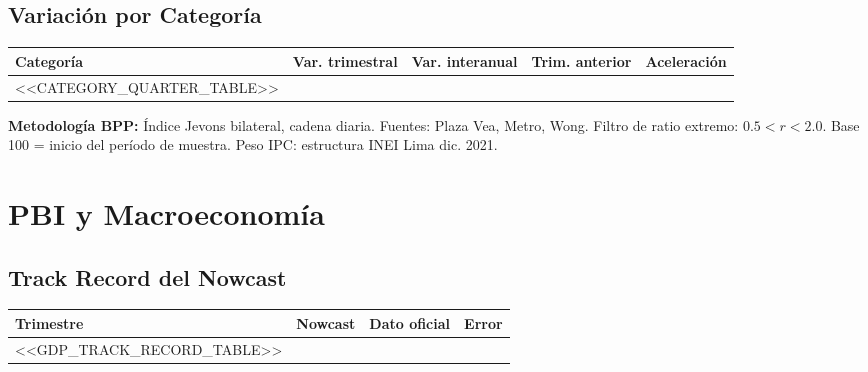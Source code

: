 \documentclass[10pt,a4paper]{article}
\begin{document}
\vspace{0.6em}

\subsection{Variación por Categoría}

\begin{center}
\begin{tabular}{lrrll}
  \toprule
  \textbf{Categoría} & \textbf{Var. trimestral} & \textbf{Var. interanual} & \textbf{Trim. anterior} & \textbf{Aceleración} \\
  \midrule
<<CATEGORY_QUARTER_TABLE>>  \bottomrule
\end{tabular}
\end{center}

\vspace{0.6em}

\begin{tcolorbox}[
  enhanced,
  colback=bg,
  colframe=border,
  boxrule=0.5pt,
  arc=2pt,
  left=6pt, right=6pt, top=4pt, bottom=4pt,
]
  {\footnotesize\color{ink3}
    \textbf{Metodología BPP:} Índice Jevons bilateral, cadena diaria.
    Fuentes: Plaza Vea, Metro, Wong. Filtro de ratio extremo: $0.5 < r < 2.0$.
    Base 100 = inicio del período de muestra. Peso IPC: estructura INEI Lima dic. 2021.
  }
\end{tcolorbox}

\newpage

\section{PBI y Macroeconomía}

\subsection{Track Record del Nowcast}

\begin{center}
\begin{tabular}{lrrl}
  \toprule
  \textbf{Trimestre} & \textbf{Nowcast} & \textbf{Dato oficial} & \textbf{Error} \\
  \midrule
<<GDP_TRACK_RECORD_TABLE>>  \bottomrule
\end{tabular}
\end{center}
\end{document}

